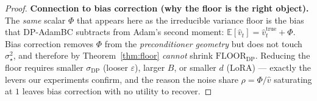 \begin{proof}
\medskip
\noindent\textbf{Connection to bias correction (why the floor is the right object).}
The \emph{same} scalar $\Phi$ that appears here as the irreducible variance floor is the bias that DP-AdamBC subtracts from Adam's second moment: $\mathbb E[\hat v_t]=\hat v_t^{\mathrm{true}}+\Phi$. Bias correction removes $\Phi$ from the \emph{preconditioner geometry} but does not touch $\sigma_\star^2$, and therefore by Theorem~\ref{thm:floor} \emph{cannot} shrink $\mathrm{FLOOR}_{\mathrm{DP}}$. Reducing the floor requires smaller $\sigma_{\mathrm{DP}}$ (looser $\varepsilon$), larger $B$, or smaller $d$ (LoRA) --- exactly the levers our experiments confirm, and the reason the noise share $\rho=\Phi/\hat v$ saturating at $1$ leaves bias correction with no utility to recover.
\end{proof}

